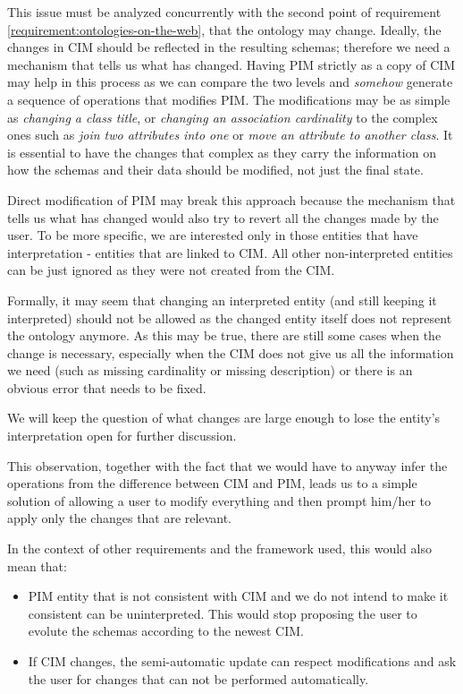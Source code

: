 This issue must be analyzed concurrently with the second point of requirement \ref{requirement:ontologies-on-the-web}, that the ontology may change. Ideally, the changes in CIM should be reflected in the resulting schemas; therefore we need a mechanism that tells us what has changed. Having PIM strictly as a copy of CIM may help in this process as we can compare the two levels and \textit{somehow} generate a sequence of operations that modifies PIM. The modifications may be as simple as \textit{changing a class title}, or \textit{changing an association cardinality} to the complex ones such as \textit{join two attributes into one} or \textit{move an attribute to another class}. It is essential to have the changes that complex as they carry the information on how the schemas and their data should be modified, not just the final state.

Direct modification of PIM may break this approach because the mechanism that tells us what has changed would also try to revert all the changes made by the user. To be more specific, we are interested only in those entities that have interpretation - entities that are linked to CIM. All other non-interpreted entities can be just ignored as they were not created from the CIM.

Formally, it may seem that changing an interpreted entity (and still keeping it interpreted) should not be allowed as the changed entity itself does not represent the ontology anymore. As this may be true, there are still some cases when the change is necessary, especially when the CIM does not give us all the information we need (such as missing cardinality or missing description) or there is an obvious error that needs to be fixed.

We will keep the question of what changes are large enough to lose the entity's interpretation open for further discussion.

This observation, together with the fact that we would have to anyway infer the operations from the difference between CIM and PIM, leads us to a simple solution of allowing a user to modify everything and then prompt him/her to apply only the changes that are relevant.

In the context of other requirements and the framework used, this would also mean that:
\begin{itemize}
    \item PIM entity that is not consistent with CIM and we do not intend to make it consistent can be uninterpreted. This would stop proposing the user to evolute the schemas according to the newest CIM.
    \item If CIM changes, the semi-automatic update can respect modifications and ask the user for changes that can not be performed automatically.
\end{itemize}

